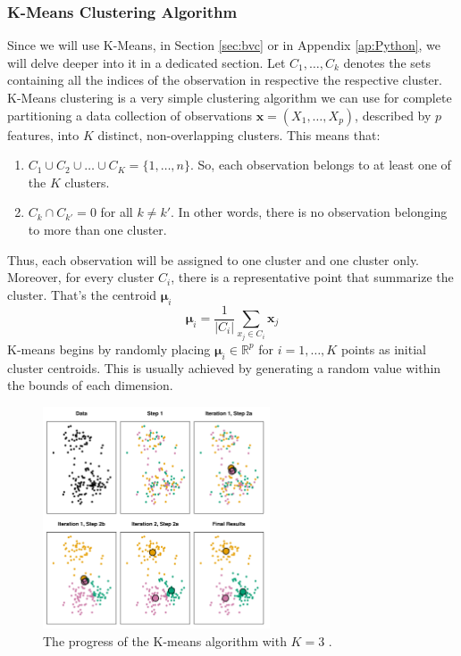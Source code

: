 
\subsubsection{K-Means Clustering Algorithm}
\label{sss:kmeans}
Since we will use K-Means, in Section \ref{sec:bvc} or in Appendix \ref{ap:Python}, we will delve deeper into it in a dedicated section. Let $C_1,\dots,C_k$ denotes the sets containing all the indices of the observation in respective the respective cluster. K-Means clustering is a very simple clustering algorithm we can use for complete partitioning a data collection of observations $\mathbf{x}=\left(X_1, \dots, X_p \right)$, described by $p$ features, into $K$ distinct, non-overlapping clusters. This means that:
\begin{enumerate}
    \item $C_1 \cup C_2 \cup \dots \cup C_K=\{1,\dots,n\}$. So, each observation belongs to at least one of the $K$ clusters.
    \item $C_k\cap C_{k'}=0$ for all $k\neq k'$. In other words, there is no observation belonging to more than one cluster.
\end{enumerate}
Thus, each observation will be assigned to one cluster and one cluster only. Moreover, for every cluster $C_i$, there is a representative point that summarize the cluster. That's the centroid $\bm{\mu}_i$
\begin{equation}
    \label{eq:centroid}
    \boldsymbol{\mu}_i=\frac{1}{\left|C_i\right|} \sum_{x_j \in C_i} \mathbf{x}_j
\end{equation}
K-means begins by randomly placing $\bm{\mu}_i \in \mathbb{R}^p$ for $i=1,\dots,K$ points as initial cluster centroids. This is usually achieved by generating a random value within the bounds of each dimension. 
\begin{figure}[H]
    \centering
    \includegraphics[width=0.6\textwidth]{Images/clustiteration.png}
    \caption[K-Means clustering iterations.]{The progress of the K-means algorithm with $K=3$ \cite{james_introduction_2021}.}
    \label{fig:clustiteration}
\end{figure}
